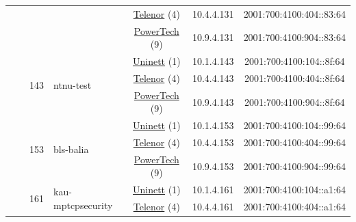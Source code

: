 \begin{small}
\begin{center}
\begin{longtable}{|c|c|c|c|c|c|c|c|}
  &  &  &  & \multicolumn{2}{|c|}{\tiny{\href{https://www.telenor.no}{Telenor} (4)}} & \tiny{10.4.4.131} & \tiny{2001:700:4100:404::83:64} \\* \cline{5-5}\cline{6-6}\cline{7-7}\cline{8-8}
  &  &  &  & \multicolumn{2}{|c|}{\tiny{\href{http://www.powertech.no}{PowerTech} (9)}} & \tiny{10.9.4.131} & \tiny{2001:700:4100:904::83:64} \\* \cline{3-3}\cline{4-4}\cline{5-5}\cline{6-6}\cline{7-7}\cline{8-8}
  &  & \multirow{3}{*}{\tiny{143}} & \multicolumn{1}{|l|}{\multirow{3}{*}{\tiny{ntnu-test}}} & \multicolumn{2}{|c|}{\tiny{\href{https://www.uninett.no}{Uninett} (1)}} & \tiny{10.1.4.143} & \tiny{2001:700:4100:104::8f:64} \\* \cline{5-5}\cline{6-6}\cline{7-7}\cline{8-8}
  &  &  &  & \multicolumn{2}{|c|}{\tiny{\href{https://www.telenor.no}{Telenor} (4)}} & \tiny{10.4.4.143} & \tiny{2001:700:4100:404::8f:64} \\* \cline{5-5}\cline{6-6}\cline{7-7}\cline{8-8}
  &  &  &  & \multicolumn{2}{|c|}{\tiny{\href{http://www.powertech.no}{PowerTech} (9)}} & \tiny{10.9.4.143} & \tiny{2001:700:4100:904::8f:64} \\* \cline{3-3}\cline{4-4}\cline{5-5}\cline{6-6}\cline{7-7}\cline{8-8}
  &  & \multirow{3}{*}{\tiny{153}} & \multicolumn{1}{|l|}{\multirow{3}{*}{\tiny{bls-balia}}} & \multicolumn{2}{|c|}{\tiny{\href{https://www.uninett.no}{Uninett} (1)}} & \tiny{10.1.4.153} & \tiny{2001:700:4100:104::99:64} \\* \cline{5-5}\cline{6-6}\cline{7-7}\cline{8-8}
  &  &  &  & \multicolumn{2}{|c|}{\tiny{\href{https://www.telenor.no}{Telenor} (4)}} & \tiny{10.4.4.153} & \tiny{2001:700:4100:404::99:64} \\* \cline{5-5}\cline{6-6}\cline{7-7}\cline{8-8}
  &  &  &  & \multicolumn{2}{|c|}{\tiny{\href{http://www.powertech.no}{PowerTech} (9)}} & \tiny{10.9.4.153} & \tiny{2001:700:4100:904::99:64} \\* \cline{3-3}\cline{4-4}\cline{5-5}\cline{6-6}\cline{7-7}\cline{8-8}
  &  & \multirow{3}{*}{\tiny{161}} & \multicolumn{1}{|l|}{\multirow{3}{*}{\tiny{kau-mptcpsecurity}}} & \multicolumn{2}{|c|}{\tiny{\href{https://www.uninett.no}{Uninett} (1)}} & \tiny{10.1.4.161} & \tiny{2001:700:4100:104::a1:64} \\* \cline{5-5}\cline{6-6}\cline{7-7}\cline{8-8}
  &  &  &  & \multicolumn{2}{|c|}{\tiny{\href{https://www.telenor.no}{Telenor} (4)}} & \tiny{10.4.4.161} & \tiny{2001:700:4100:404::a1:64} \\* \cline{5-5}\cline{6-6}\cline{7-7}\cline{8-8}

\end{longtable}
\end{center}
\end{small}
